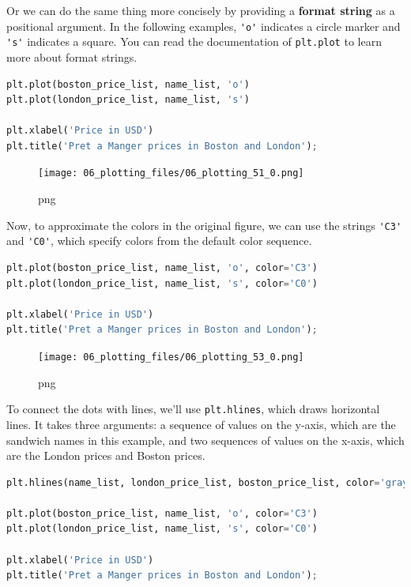 \documentclass[
]{book}
\newcommand{\passthrough}[1]{#1}
\begin{document}
Or we can do the same thing more concisely by providing a \textbf{format
string} as a positional argument. In the following examples,
\passthrough{\lstinline!'o'!} indicates a circle marker and
\passthrough{\lstinline!'s'!} indicates a square. You can read the
documentation of \passthrough{\lstinline!plt.plot!} to learn more about
format strings.

\begin{lstlisting}[language=Python]
plt.plot(boston_price_list, name_list, 'o')
plt.plot(london_price_list, name_list, 's')

plt.xlabel('Price in USD')
plt.title('Pret a Manger prices in Boston and London');
\end{lstlisting}

\begin{figure}
\centering
\texttt{[image: 06\_plotting\_files/06\_plotting\_51\_0.png]}
\caption{png}
\end{figure}

Now, to approximate the colors in the original figure, we can use the
strings \passthrough{\lstinline!'C3'!} and
\passthrough{\lstinline!'C0'!}, which specify colors from the default
color sequence.

\begin{lstlisting}[language=Python]
plt.plot(boston_price_list, name_list, 'o', color='C3')
plt.plot(london_price_list, name_list, 's', color='C0')

plt.xlabel('Price in USD')
plt.title('Pret a Manger prices in Boston and London');
\end{lstlisting}

\begin{figure}
\centering
\texttt{[image: 06\_plotting\_files/06\_plotting\_53\_0.png]}
\caption{png}
\end{figure}

To connect the dots with lines, we'll use
\passthrough{\lstinline!plt.hlines!}, which draws horizontal lines. It
takes three arguments: a sequence of values on the y-axis, which are the
sandwich names in this example, and two sequences of values on the
x-axis, which are the London prices and Boston prices.

\begin{lstlisting}[language=Python]
plt.hlines(name_list, london_price_list, boston_price_list, color='gray')

plt.plot(boston_price_list, name_list, 'o', color='C3')
plt.plot(london_price_list, name_list, 's', color='C0')

plt.xlabel('Price in USD')
plt.title('Pret a Manger prices in Boston and London');
\end{lstlisting}
\end{document}
